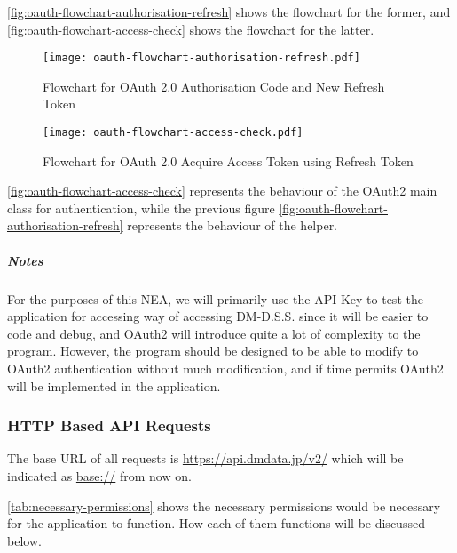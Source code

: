 \autoref{fig:oauth-flowchart-authorisation-refresh} shows the flowchart for the former, and \autoref{fig:oauth-flowchart-access-check} shows the flowchart for the latter.

\begin{figure}[htp]
    \centering
    \texttt{[image: oauth-flowchart-authorisation-refresh.pdf]}
    \caption{Flowchart for OAuth 2.0 Authorisation Code and New Refresh Token}
    \label{fig:oauth-flowchart-authorisation-refresh}
\end{figure}

\begin{figure}[htp]
    \centering
    \texttt{[image: oauth-flowchart-access-check.pdf]}
    \caption{Flowchart for OAuth 2.0 Acquire Access Token using Refresh Token}
    \label{fig:oauth-flowchart-access-check}
\end{figure}

\autoref{fig:oauth-flowchart-access-check} represents the behaviour of the OAuth2 main class for authentication, while the previous figure \autoref{fig:oauth-flowchart-authorisation-refresh} represents the behaviour of the helper.

\subparagraph{Notes}

For the purposes of this NEA, we will primarily use the API Key to test the application for accessing  way of accessing DM-D.S.S. since it will be easier to code and debug, and OAuth2 will introduce quite a lot of complexity to the program. However, the program should be designed to be able to modify to OAuth2 authentication without much modification, and if time permits OAuth2 will be implemented in the application.

\subsubsection{HTTP Based API Requests}

The base URL of all requests is \url{https://api.dmdata.jp/v2/} which will be indicated as \url{base://} from now on.

\autoref{tab:necessary-permissions} shows the necessary permissions would be necessary for the application to function. How each of them functions will be discussed below.


